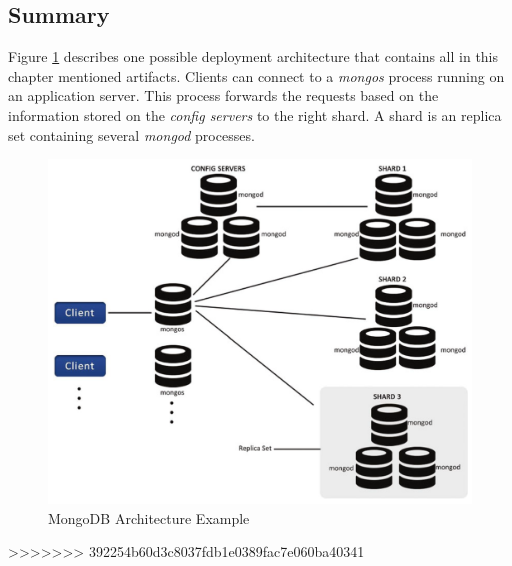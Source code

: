 \subsection{Summary}
Figure \ref{arch-example} describes one possible deployment architecture that contains all in this chapter mentioned artifacts. Clients can connect to a \textit{mongos} process running on an application server. This process forwards the requests based on the information stored on the \textit{config servers} to the right shard. A shard is an replica set containing several \textit{mongod} processes.
\begin{figure}[H]
\includegraphics[width=\linewidth,keepaspectratio]{images/deployment.png}
\caption{MongoDB Architecture Example}
\label{arch-example}
\end{figure}


>>>>>>> 392254b60d3c8037fdb1e0389fac7e060ba40341
